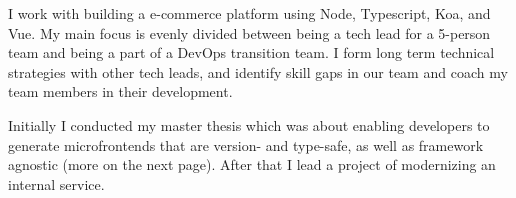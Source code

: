 \documentclass[10pt,a4paper]{altacv}
\begin{document}

\begin{fullwidth}
\makecvheader
\end{fullwidth}





I work with building a e-commerce platform using Node, Typescript, Koa, and Vue. My main focus is evenly divided between being a tech lead for a 5-person team and being a part of a DevOps transition team. I form long term technical strategies with other tech leads, and identify skill gaps in our team and coach my team members in their development.

\divider


Initially I conducted my master thesis which was about enabling developers to generate microfrontends that are version- and type-safe, as well as framework agnostic (more on the next page). After that I lead a project of modernizing an internal service.
\divider

\end{document}
